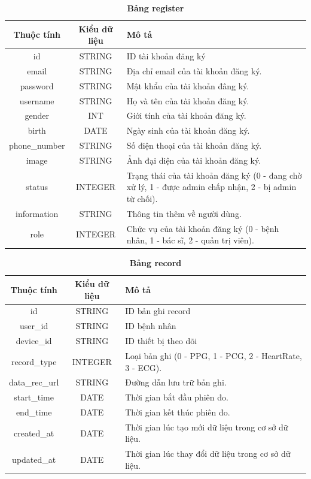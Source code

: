 \begin{table}[H]
  \caption{\bfseries \fontsize{12pt}{0pt}\selectfont Bảng register}
  \centering
  \begin{tabularx}{\textwidth}{|c|c|X|}
    \hline
    \textbf{Thuộc tính} & \textbf{Kiểu dữ liệu} & \textbf{Mô tả} \\
    \hline
    id & STRING & ID tài khoản đăng ký \\
    \hline
    email & STRING & Địa chỉ email của tài khoản đăng ký. \\
    \hline
    password & STRING & Mật khẩu của tài khoản đâng ký. \\
    \hline
    username & STRING & Họ và tên của tài khoản đăng ký. \\
    \hline
    gender & INT & Giới tính của tài khoản đăng ký. \\
    \hline
    birth & DATE & Ngày sinh của tài khoản đăng ký. \\
    \hline
    phone\_number & STRING & Số điện thoại của tài khoản đăng ký. \\
    \hline
    image & STRING & Ảnh đại diện của tài khoản đăng ký. \\
    \hline
    status & INTEGER & Trạng thái của tài khoản đăng ký (0 - đang chờ xử lý, 1 - được admin chấp nhận, 2 - bị admin từ chối). \\
    \hline
    information & STRING & Thông tin thêm về người dùng. \\
    \hline
    role & INTEGER & Chức vụ của tài khoản đăng ký (0 - bệnh nhân, 1 - bác sĩ, 2 - quản trị viên).\\
    \hline
  \end{tabularx}
\end{table}

\begin{table}[H]
  \caption{\bfseries \fontsize{12pt}{0pt}\selectfont Bảng record}
  \centering
  \begin{tabularx}{\textwidth}{|c|c|X|}
    \hline
    \textbf{Thuộc tính} & \textbf{Kiểu dữ liệu} & \textbf{Mô tả} \\
    \hline
    id & STRING & ID bản ghi record  \\
    \hline
    user\_id & STRING & ID bệnh nhân  \\
    \hline
    device\_id & STRING & ID thiết bị theo dõi  \\
    \hline
    record\_type & INTEGER & Loại bản ghi (0 - PPG, 1 - PCG, 2 - HeartRate, 3 - ECG). \\
    \hline
    data\_rec\_url & STRING & Đường dẫn lưu trữ bản ghi. \\
    \hline
    start\_time & DATE & Thời gian bắt đầu phiên đo. \\
    \hline
    end\_time & DATE & Thời gian kết thúc phiên đo. \\
    \hline
    created\_at & DATE & Thời gian lúc tạo mới dữ liệu trong cơ sở dữ liệu. \\
    \hline
    updated\_at & DATE & Thời gian lúc thay đổi dữ liệu trong cơ sở dữ liệu. \\
    \hline
  \end{tabularx}
\end{table}

